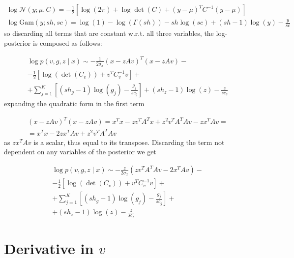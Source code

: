\documentclass{paper}
\begin{document}
\begin{eqnarray}
\log  \mathcal{N}(y;\mu,C) = -\frac{1}{2} \left[ \log (2\pi) + \log \det (C) + (y - \mu)^T C^{-1} (y-\mu) \right] \\
\log  \textrm{Gam}(y;sh,sc) = \log(1) - \log(\Gamma(sh)) - sh \log(sc) + (sh-1) \log(y) - \frac{y}{sc}
\end{eqnarray}
%
so discarding all terms that are constant w.r.t. all three variables, the log-posterior is composed as follows:

\begin{equation}
\begin{split}
\log p(v,g,z \mid x) \sim -\frac{1}{2 \sigma_x}(x - zAv)^T (x - zAv) - \\
- \frac{1}{2} \left[ \log \left( \det \left( C_v \right) \right) + v^T C_v^{-1} v \right] + \\
+ \sum_{j=1}^K \left[ (sh_g - 1) \log(g_j) - \frac{g_j}{sc_g} \right] + (sh_z - 1) \log(z) - \frac{z}{sc_z}
\end{split}
\end{equation}
% 
expanding the quadratic form in the first term

\begin{equation}
\begin{split}
(x - zAv)^T (x - zAv) = x^Tx -zv^TA^Tx + z^2v^TA^TAv -zx^TAv = \\
= x^Tx -2zx^TAv + z^2v^TA^TAv
\end{split}
\end{equation}
% 
as $zx^TAv$ is a scalar, thus equal to its transpose. Discarding the term not dependent on any variables of the posterior we get

\begin{equation}
\begin{split}
\log p(v,g,z \mid x) \sim - \frac{z}{2 \sigma_x} \left( zv^TA^TAv - 2x^TAv \right)- \\
- \frac{1}{2} \left[ \log \left( \det \left( C_v \right) \right) + v^T C_v^{-1} v \right] + \\
+ \sum_{j=1}^K \left[ (sh_g - 1) \log(g_j) - \frac{g_j}{sc_g} \right] + \\
+ (sh_z - 1) \log(z) - \frac{z}{sc_z}
\end{split}
\end{equation}

\section{Derivative in $v$}
\end{document}
